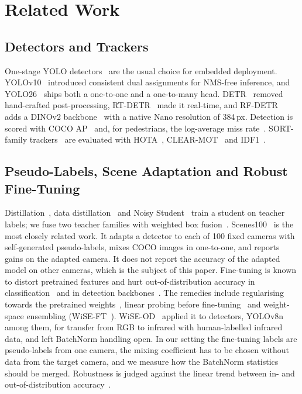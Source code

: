 \section{Related Work}
\label{sec:related}
\subsection{Detectors and Trackers}
One-stage YOLO detectors~\cite{redmon2016yolo} are the usual choice for embedded deployment. YOLOv10~\cite{wang2024yolov10}
introduced consistent dual assignments for NMS-free inference, and YOLO26~\cite{jocher2026yolo26,ultralytics} ships both a
one-to-one and a one-to-many head. DETR~\cite{carion2020detr} removed hand-crafted post-processing, RT-DETR~\cite{zhao2024rtdetr}
made it real-time, and RF-DETR~\cite{robinson2026rfdetr} adds a DINOv2 backbone~\cite{oquab2024dinov2} with a native Nano
resolution of 384\,px. Detection is scored with COCO AP~\cite{lin2014coco} and, for pedestrians, the log-average miss
rate~\cite{dollar2012pedestrian,zhang2017citypersons}. SORT-family trackers~\cite{bewley2016sort,zhang2022bytetrack,cao2023ocsort,aharon2022botsort,yang2023cbiou,stanczyk2024mcbyte}
are evaluated with HOTA~\cite{luiten2021hota}, CLEAR-MOT~\cite{bernardin2008clear} and IDF1~\cite{ristani2016idf1}.

\subsection{Pseudo-Labels, Scene Adaptation and Robust Fine-Tuning}
Distillation~\cite{hinton2015distilling}, data distillation~\cite{radosavovic2018datadistill} and Noisy
Student~\cite{xie2020noisystudent} train a student on teacher labels; we fuse two teacher families with weighted box
fusion~\cite{solovyev2021wbf}. Scenes100~\cite{zhang2023scenes100} is the most closely related work. It adapts a detector to each of
100 fixed cameras with self-generated pseudo-labels, mixes COCO images in one-to-one, and reports gains on the adapted
camera. It does not report the accuracy of the adapted model on other cameras, which is the subject of this paper. Fine-tuning is
known to distort pretrained features and hurt out-of-distribution accuracy in classification~\cite{kumar2022lpft} and in
detection backbones~\cite{saito2023mindbackbone}. The remedies include regularising towards the pretrained
weights~\cite{li2018l2sp}, linear probing before fine-tuning~\cite{kumar2022lpft} and weight-space ensembling
(WiSE-FT~\cite{wortsman2022wise}). WiSE-OD~\cite{medeiros2026wiseod} applied it to detectors, YOLOv8n among them, for
transfer from RGB to infrared with human-labelled infrared data, and left BatchNorm handling open. In our setting
the fine-tuning labels are pseudo-labels from one camera, the mixing coefficient has to be chosen without data from
the target camera, and we measure how the BatchNorm statistics should be merged. Robustness is judged against the linear trend between in- and
out-of-distribution accuracy~\cite{taori2020shift}.


